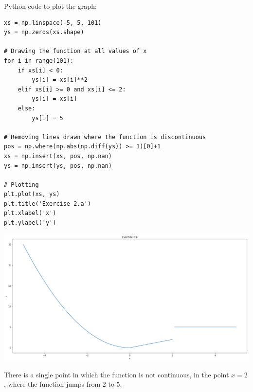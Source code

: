 Python code to plot the graph:
\begin{verbatim}
xs = np.linspace(-5, 5, 101)
ys = np.zeros(xs.shape)

# Drawing the function at all values of x
for i in range(101):
    if xs[i] < 0:
        ys[i] = xs[i]**2 
    elif xs[i] >= 0 and xs[i] <= 2:
        ys[i] = xs[i]
    else:
        ys[i] = 5
        
# Removing lines drawn where the function is discontinuous
pos = np.where(np.abs(np.diff(ys)) >= 1)[0]+1
xs = np.insert(xs, pos, np.nan)
ys = np.insert(ys, pos, np.nan)

# Plotting 
plt.plot(xs, ys) 
plt.title('Exercise 2.a')
plt.xlabel('x')
plt.ylabel('y')
\end{verbatim}

\begin{center}
\includegraphics[width=\linewidth]{2a.png}
\end{center}
There is a single point in which the function is not continuous, in the point $x=2$, where the function jumps from $2$ to $5$.